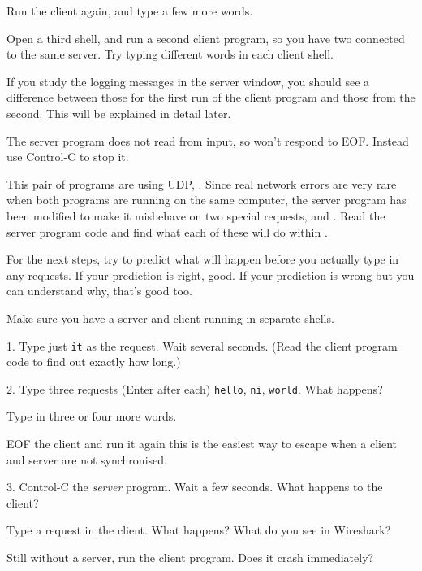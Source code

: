 Run the client again, and type a few more words.

Open a third shell, and run a second client program, so you have two connected to the
same server. Try typing different words in each client shell.

\begin{IMPORTANT}
If you study the logging messages in the server window, you should see a difference
between those for the first run of the client program and those from the second.
This will be explained in detail later.
\end{IMPORTANT}

The server program does not read from input, so won't respond to EOF. Instead use
Control-C to stop it.



This pair of programs are using UDP, . Since real
network errors are very rare when both programs are running on the same computer,
the server program has been modified to make it misbehave on two special requests,
 and . Read the server program code and find what each of these will
do within .

\begin{IMPORTANT}
For the next steps, try to predict what will happen before you actually type in any
requests. If your prediction is right, good. If your prediction is wrong but you
can understand why, that's good too.
\end{IMPORTANT}

Make sure you have a server and client running in separate shells.

1. Type just \texttt{it} as the request. Wait several seconds. (Read the client program
code to find out exactly how long.)

2. Type three requests (Enter after each) \texttt{hello}, \texttt{ni}, \texttt{world}.
What happens?

Type in three or four more words.

EOF the client and run it again \DSH this is the easiest way to escape when
a client and server are not synchronised.

3. Control-C the \emph{server} program. Wait a few seconds. What happens to the client?

Type a request in the client. What happens? What do you see in Wireshark?

Still without a server, run the client program. Does it crash immediately?



